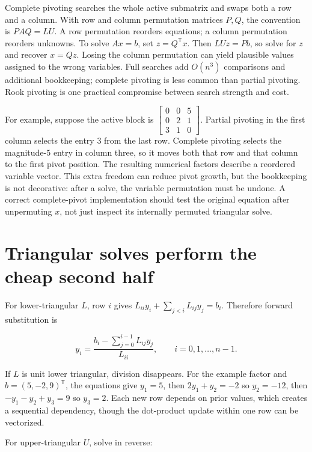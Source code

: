 Complete pivoting searches the whole active submatrix and swaps both a row and a column. With row and column permutation matrices \(P,Q\), the convention is \(PAQ=LU\). A row permutation reorders equations; a column permutation reorders unknowns. To solve \(Ax=b\), set \(z=Q^\mathsf T x\). Then \(LUz=Pb\), so solve for \(z\) and recover \(x=Qz\). Losing the column permutation can yield plausible values assigned to the wrong variables. Full searches add \(O(n^3)\) comparisons and additional bookkeeping; complete pivoting is less common than partial pivoting. Rook pivoting is one practical compromise between search strength and cost.

For example, suppose the active block is \(\begin{bmatrix}0&0&5\\0&2&1\\3&1&0\end{bmatrix}\). Partial pivoting in the first column selects the entry \(3\) from the last row. Complete pivoting selects the magnitude-\(5\) entry in column three, so it moves both that row and that column to the first pivot position. The resulting numerical factors describe a reordered variable vector. This extra freedom can reduce pivot growth, but the bookkeeping is not decorative: after a solve, the variable permutation must be undone. A correct complete-pivot implementation should test the original equation after unpermuting \(x\), not just inspect its internally permuted triangular solve.

\section{Triangular solves perform the cheap second half}\label{01-foundations-i-ch019-triangular-solves-perform-the-cheap-second-half}

For lower-triangular \(L\), row \(i\) gives \(L_{ii}y_i+\sum_{j<i}L_{ij}y_j=b_i\). Therefore forward substitution is

\[
y_i=\frac{b_i-\sum_{j=0}^{i-1}L_{ij}y_j}{L_{ii}},\qquad i=0,1,\ldots,n-1.
\]

If \(L\) is unit lower triangular, division disappears. For the example factor and \(b=(5,-2,9)^\mathsf T\), the equations give \(y_1=5\), then \(2y_1+y_2=-2\) so \(y_2=-12\), then \(-y_1-y_2+y_3=9\) so \(y_3=2\). Each new row depends on prior values, which creates a sequential dependency, though the dot-product update within one row can be vectorized.

For upper-triangular \(U\), solve in reverse:

